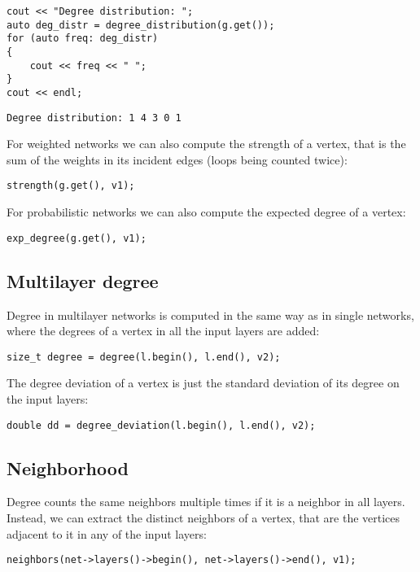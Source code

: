 \begin{lstlisting}[style=c++] 
cout << "Degree distribution: ";
auto deg_distr = degree_distribution(g.get());
for (auto freq: deg_distr)
{
    cout << freq << " ";
}
cout << endl;
\end{lstlisting}
\begin{lstlisting}[style=out]
Degree distribution: 1 4 3 0 1 
\end{lstlisting}

For weighted networks we can also compute the strength of a vertex, that is the sum of the weights in its incident edges (loops being counted twice):
\begin{lstlisting}[style=c++]
strength(g.get(), v1);
\end{lstlisting}

For probabilistic networks we can also compute the expected degree of a vertex:
\begin{lstlisting}[style=c++]
exp_degree(g.get(), v1);
\end{lstlisting}

\subsection{Multilayer degree}

Degree in multilayer networks is computed in the same way as in single networks, where the degrees of a vertex in all the input layers are added:
\begin{lstlisting}[style=c++] 
size_t degree = degree(l.begin(), l.end(), v2);
\end{lstlisting}

The degree deviation of a vertex is just the standard deviation of its degree on the input layers:
\begin{lstlisting}[style=c++] 
double dd = degree_deviation(l.begin(), l.end(), v2);
\end{lstlisting}

\subsection{Neighborhood}

Degree counts the same neighbors multiple times if it is a neighbor in all layers. Instead, we can extract the distinct neighbors of a vertex, that are the vertices adjacent to it in any of the input layers:
\begin{lstlisting}[style=c++] 
neighbors(net->layers()->begin(), net->layers()->end(), v1);
\end{lstlisting}

